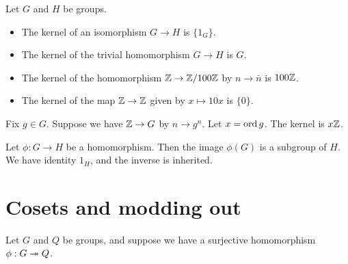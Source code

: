 \documentclass[11pt]{scrreport}
\begin{document}
\begin{example}
    Let $G$ and $H$ be groups.
    \begin{itemize}
        \item The kernel of an isomorphism $G\to H$ is $\{1_G\}$.
        \item The kernel of the trivial homomorphism $G\to H$ is $G$.
        \item The kernel of the homomorphism $\mathbb Z\to\mathbb Z/100\mathbb Z$ by $n\to \bar n$ is $100\mathbb Z$.
        \item The kernel of the map $\mathbb Z\to\mathbb Z$ given by $x\mapsto 10x$ is $\{0\}$.
    \end{itemize}
\end{example}
\begin{remark}
    Fix $g\in G$. Suppose we have $\mathbb Z\to G$ by $n\to g^n$. Let $x=\operatorname{ord} g$. The kernel is $x\mathbb Z$.
\end{remark}
\begin{remark}
    Let $\phi:G\to H$ be a homomorphism. Then the image $\phi(G)$ is a subgroup of $H$. We have identity $1_H$, and the inverse is inherited.
\end{remark}
\section{Cosets and modding out}
Let $G$ and $Q$ be groups, and suppose we have a surjective homomorphism $\phi : G \twoheadrightarrow Q$.
\end{document}
